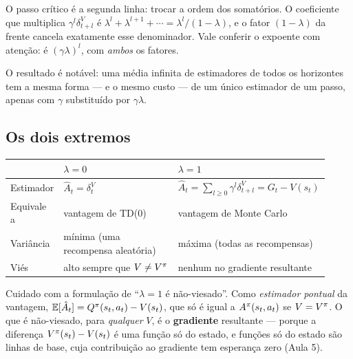 \documentclass[11pt]{article}
\newcommand{\Ahat}{\hat{A}}
\newcommand{\Advpi}{A^{\pol}}
\begin{document}
\begin{ideiabox}
  O passo crítico é a segunda linha: trocar a ordem dos somatórios. O coeficiente que
  multiplica $\gamma^{l}\delta^V_{t+l}$ é $\lambda^{l}+\lambda^{l+1}+\cdots =
  \lambda^{l}/(1-\lambda)$, e o fator $(1-\lambda)$ da frente cancela exatamente esse
  denominador. Vale conferir o expoente com atenção: é $(\gamma\lambda)^l$, com
  \emph{ambos} os fatores.
\end{ideiabox}

O resultado é notável: uma média infinita de estimadores de todos os horizontes tem a
mesma forma --- e o mesmo custo --- de um único estimador de um passo, apenas com
$\gamma$ substituído por $\gamma\lambda$.

\subsection{Os dois extremos}

\begin{center}\small
\begin{tabular}{@{}>{\raggedright\arraybackslash}p{0.16\linewidth}
                 >{\raggedright\arraybackslash}p{0.36\linewidth}
                 >{\raggedright\arraybackslash}p{0.40\linewidth}@{}}
\toprule
 & $\lambda = 0$ & $\lambda = 1$ \\
\midrule
Estimador & $\Ahat_t = \delta^V_t$ & $\Ahat_t = \sum_{l\ge0}\gamma^l\delta^V_{t+l} = G_t - V(s_t)$\\
Equivale a & vantagem de TD(0) & vantagem de Monte Carlo \\
Variância & mínima (uma recompensa aleatória) & máxima (todas as recompensas) \\
Viés & alto sempre que $V\ne V^{\pi}$ & nenhum no gradiente resultante \\
\bottomrule
\end{tabular}
\end{center}

\begin{alertabox}
  Cuidado com a formulação de ``$\lambda=1$ é não-viesado''. Como \emph{estimador
  pontual} da vantagem, $\E[\Ahat_t] = \Qpi(s_t,a_t) - V(s_t)$, que só é igual a
  $\Advpi(s_t,a_t)$ se $V = V^{\pi}$. O que é não-viesado, para \emph{qualquer} $V$, é o
  \textbf{gradiente} resultante --- porque a diferença $V^{\pi}(s_t) - V(s_t)$ é uma função
  só do estado, e funções só do estado são linhas de base, cuja contribuição ao gradiente
  tem esperança zero (Aula 5).
\end{alertabox}
\end{document}
